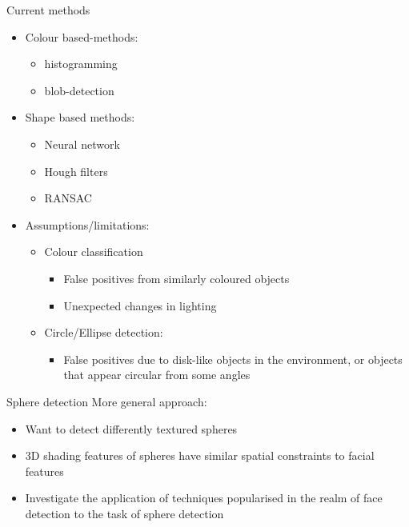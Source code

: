 \begin{frame}{Current methods}
	\begin{itemize}
		\item Colour based-methods:
			\begin{itemize}
				\item histogramming
				\item blob-detection
			\end{itemize}
		\item Shape based methods:
			\begin{itemize}
				\item Neural network
				\item Hough filters
				\item RANSAC
			\end{itemize}
		\item Assumptions/limitations:
			\begin{itemize}
				\item Colour classification
					\begin{itemize}
						\item False positives from similarly coloured objects
						\item Unexpected changes in lighting
					\end{itemize}
				\item Circle/Ellipse detection:
					\begin{itemize}
						\item False positives due to disk-like objects in the environment, or objects that appear circular from some angles
					\end{itemize}
			\end{itemize}
	\end{itemize}
\end{frame}

\begin{frame}{Sphere detection}
	More general approach:
	\begin{itemize}
		\item Want to detect differently textured spheres
		\item 3D shading features of spheres have similar spatial constraints to facial features
		\item Investigate the application of techniques popularised in the realm of face detection to the task of sphere detection
	\end{itemize}
\end{frame}

